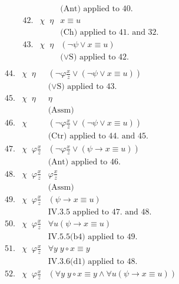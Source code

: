 \begin{enumerate}[1.]
\[\begin{array}{lll}
\   & \                                       & \mbox{(Ant) applied to 40.} \\
42. & \chi \;\; \eta & x \equiv u \\
\   & \                                       & \mbox{(Ch) applied to 41. and 32.} \\
43. & \chi \;\; \eta & (\neg \psi \lor x \equiv u) \\
\   & \                                       & \mbox{($\lor$S) applied to 42.} \\
\end{array}
\]
\[
\begin{array}{lll}
44. & \chi \;\; \eta & (\neg \varphi\frac{x}{z} \lor (\neg \psi \lor x \equiv u)) \\
\   & \                                       & \mbox{($\lor$S) applied to 43.} \\
45. & \chi \;\; \eta & \eta \\
\   & \                                       & \mbox{(Assm)} \\
46. & \chi & (\neg \varphi\frac{x}{z} \lor (\neg \psi \lor x \equiv u)) \\
\   & \                                       & \mbox{(Ctr) applied to 44. and 45.} \\
47. & \chi \;\; \varphi\frac{x}{z} & (\neg \varphi\frac{x}{z} \lor (\psi \rightarrow x \equiv u)) \\
\   & \                                       & \mbox{(Ant) applied to 46.} \\
48. & \chi \;\; \varphi\frac{x}{z} & \varphi\frac{x}{z} \\
\   & \                                       & \mbox{(Assm)} \\
49. & \chi \;\; \varphi\frac{x}{z} & (\psi \rightarrow x \equiv u) \\
\   & \                                       & \mbox{IV.3.5 applied to 47. and 48.} \\
50. & \chi \;\; \varphi\frac{x}{z} & \forall u (\psi \rightarrow x \equiv u) \\
\   & \                                       & \mbox{IV.5.5(b4) applied to 49.} \\
51. & \chi \;\; \varphi\frac{x}{z} & \forall y \; y \circ x \equiv y \\
\   & \                         & \mbox{IV.3.6(d1) applied to 48.} \\
52. & \chi \;\; \varphi\frac{x}{z} & (\forall y \; y \circ x \equiv y \land \forall u (\psi \rightarrow x \equiv u)) \\

\end{array}\]
\end{enumerate}
